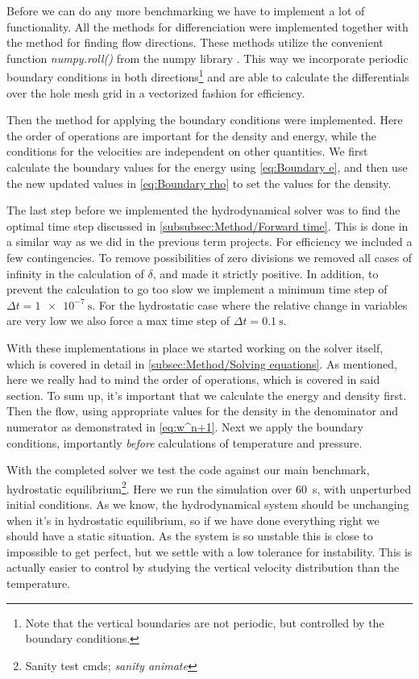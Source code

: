 \documentclass[11pt,a4paper,twocolumn,titlepage]{article}
\begin{document}
Before we can do any more benchmarking we have to implement a lot of functionality. All the methods for differenciation were implemented together with the method for finding flow directions. These methods utilize the convenient function \textit{numpy.roll()} from the numpy library \citep{roll_docs}. This way we incorporate periodic boundary conditions in both directions\footnote{Note that the vertical boundaries are not periodic, but controlled by the boundary conditions.} and are able to calculate the differentials over the hole mesh grid in a vectorized fashion for efficiency.

Then the method for applying the boundary conditions were implemented. Here the order of operations are important for the density and energy, while the conditions for the velocities are independent on other quantities. We first calculate the boundary values for the energy using \cref{eq:Boundary e}, and then use the new updated values in \cref{eq:Boundary rho} to set the values for the density.

The last step before we implemented the hydrodynamical solver was to find the optimal time step discussed in \cref{subsubsec:Method/Forward time}. This is done in a similar way as we did in the previous term projects. For efficiency we included a few contingencies. To remove possibilities of zero divisions we removed all cases of infinity in the calculation of $\delta$, and made it strictly positive. In addition, to prevent the calculation to go too slow we implement a minimum time step of $\Delta t = \SI{1e-7}{\s}$. For the hydrostatic case where the relative change in variables are very low we also force a max time step of $\Delta t = \SI{0.1}{\s}$.

With these implementations in place we started working on the solver itself, which is covered in detail in \cref{subsec:Method/Solving equations}. As mentioned, here we really had to mind the order of operations, which is covered in said section. To sum up, it's important that we calculate the energy and density first. Then the flow, using appropriate values for the density in the denominator and numerator as demonstrated in \cref{eq:w^n+1}. Next we apply the boundary conditions, importantly \textit{before} calculations of temperature and pressure.

With the completed solver we test the code against our main benchmark, hydrostatic equilibrium\footnote{Sanity test cmds; \textit{sanity animate}}. Here we run the simulation over \SI{60}{\s}, with unperturbed initial conditions. As we know, the hydrodynamical system should be unchanging when it's in hydrostatic equilibrium, so if we have done everything right we should have a static situation. As the system is so unstable this is close to impossible to get perfect, but we  settle with a low tolerance for instability. This is actually easier to control by studying the vertical velocity distribution than the temperature.
\end{document}
